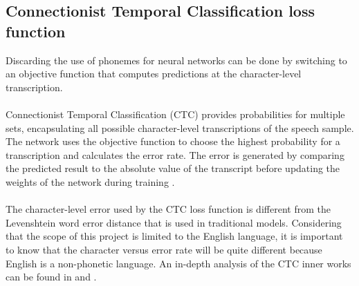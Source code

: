 \subsection{Connectionist Temporal Classification loss function}
 Discarding the use of phonemes for neural networks can be done by switching to an objective function that computes predictions at the character-level transcription.\\\\
Connectionist Temporal Classification (CTC) provides probabilities for multiple sets, encapsulating all possible character-level transcriptions of the speech sample.
The network uses the objective function to choose the highest probability for a transcription and calculates the error rate. The error is generated by comparing the
predicted result to the absolute value of the transcript before updating the weights of the network during training \cite{Great}.\\\\
The character-level error used by the CTC loss function is different from the Levenshtein \cite{stratonovich1960conditional} word error distance that is used in traditional models. Considering that the scope of this project is limited to the English language, it is important to know
that the character versus error rate will be quite different because English is a non-phonetic language. An in-depth analysis of the CTC inner works can be found in \cite{CTC1} and \cite{CTC2}.